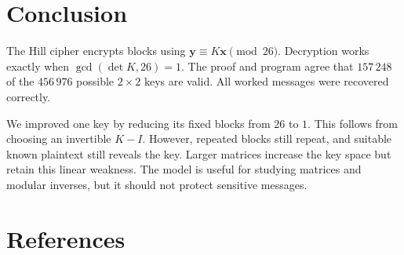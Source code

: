 \documentclass[11pt,a4paper]{article}
\newcommand{\x}{\mathbf{x}}   %
\newcommand{\y}{\mathbf{y}}   %
\theoremstyle{plain}
\theoremstyle{definition}
\begin{document}
\section{Conclusion}
The Hill cipher encrypts blocks using $\y\equiv K\x\pmod{26}$. Decryption works exactly when $\gcd(\det K,26)=1$. The proof and program agree that $157\,248$ of the $456\,976$ possible $2\times2$ keys are valid. All worked messages were recovered correctly.

We improved one key by reducing its fixed blocks from $26$ to $1$. This follows from choosing an invertible $K-I$. However, repeated blocks still repeat, and suitable known plaintext still reveals the key. Larger matrices increase the key space but retain this linear weakness. The model is useful for studying matrices and modular inverses, but it should not protect sensitive messages.

\clearpage
\section*{References}
\end{document}
